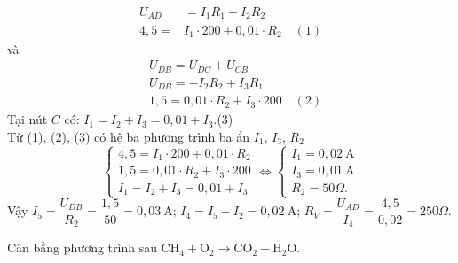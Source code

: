 \begin{vd}
{$$\begin{aligned}
		U_{A D} &=I_1 R_1+I_2 R_2 \\
		4{,}5=& I_1 \cdot 200+0{,}01 \cdot R_2 \quad(1)
			\end{aligned}$$
và $$			\begin{aligned}
		& U_{D B}=U_{D C}+U_{C B} \\
		& U_{D B}=-I_2 R_2+I_3 R_1 \\
		& 1,5=0,01 \cdot R_2+I_3 \cdot 200\quad(2)
	\end{aligned}
	$$
	Tại nút $C$ có:
	$	I_1=I_2+I_3=0{,}01+I_3$.\quad(3)\\
Từ  (1), (2), (3) có hệ ba phương trình ba ẩn $I_1$, $I_3$, $R_2$
	$$
	\left\{\begin{array} { l } 
		{ 4 , 5 = I _ { 1 } \cdot 2 0 0 + 0 , 0 1 \cdot R _ { 2 } } \\
		{ 1 , 5 = 0 , 0 1 \cdot R _ { 2 } + I _ { 3 } \cdot 2 0 0 } \\
		{ I _ { 1 } = I _ { 2 } + I _ { 3 } = 0 , 0 1 + I _ { 3 } }
	\end{array} \Leftrightarrow \left\{\begin{array}{l}
		I_1=0{,}02 \mathrm{~A} \\
		I_3=0{,}01 \mathrm{~A} \\
		R_2=50 \Omega.
	\end{array}\right.\right.
	$$
Vậy $I_5=\dfrac{U_{D B}}{R_2}=\dfrac{1{,}5}{50}=0{,}03 \mathrm{~A}$; $I_4=I_5-I_2=0{,}02 \mathrm{~A}$;
		$ R_V=\dfrac{U_{A D}}{I_4}=\dfrac{4{,}5}{0{,}02}=250 \Omega$.
}
	\end{vd}
\begin{vd}%
	Cân bằng phương trình sau
$\mathrm{CH}_4+\mathrm{O}_2\rightarrow\mathrm{CO}_2+\mathrm{H}_2 \mathrm{O}$.
	\end{vd}

